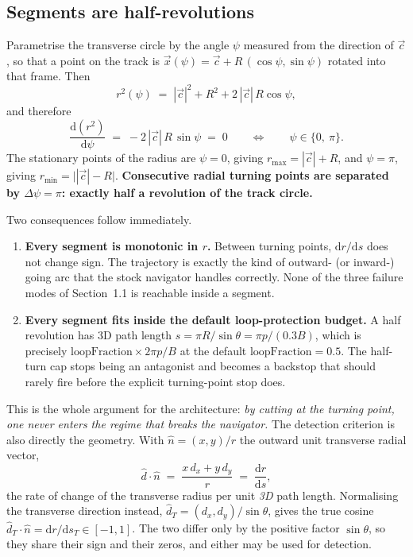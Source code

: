 \documentclass[11pt,a4paper]{article}
\begin{document}
\subsection{Segments are half-revolutions}

Parametrise the transverse circle by the angle $\psi$ measured from the
direction of $\vec{c}$, so that a point on the track is
$\vec{x}(\psi) = \vec{c} + R\,(\cos\psi, \sin\psi)$ rotated into that frame.
Then
\begin{equation}
  r^2(\psi) \;=\; |\vec{c}|^2 + R^2 + 2\,|\vec{c}|\,R\cos\psi ,
  \label{eq:rpsi}
\end{equation}
and therefore
\begin{equation}
  \frac{\mathrm{d}(r^2)}{\mathrm{d}\psi} \;=\; -2\,|\vec{c}|\,R\,\sin\psi
  \;=\; 0
  \qquad\Longleftrightarrow\qquad
  \psi \in \{0,\ \pi\} .
\end{equation}
The stationary points of the radius are $\psi = 0$, giving
$r_{\max} = |\vec{c}| + R$, and $\psi = \pi$, giving
$r_{\min} = \bigl||\vec{c}| - R\bigr|$. \textbf{Consecutive radial turning
points are separated by $\Delta\psi = \pi$: exactly half a revolution of the
track circle.}

Two consequences follow immediately.

\begin{enumerate}
\item \textbf{Every segment is monotonic in $r$.} Between turning points,
  $\mathrm{d}r/\mathrm{d}s$ does not change sign. The trajectory is exactly the
  kind of outward- (or inward-) going arc that the stock navigator handles
  correctly. None of the three failure modes of Section~1.1 is reachable inside
  a segment.
\item \textbf{Every segment fits inside the default loop-protection budget.}
  A half revolution has 3D path length $s = \pi R / \sin\theta = \pi p / (0.3 B)$,
  which is precisely $\text{loopFraction} \times 2\pi p / B$ at the default
  $\text{loopFraction} = 0.5$. The half-turn cap stops being an antagonist and
  becomes a backstop that should rarely fire before the explicit turning-point
  stop does.
\end{enumerate}

\noindent
This is the whole argument for the architecture: \emph{by cutting at the turning
point, one never enters the regime that breaks the navigator.} The detection
criterion is also directly the geometry. With $\hat{n} = (x,y)/r$ the outward
unit transverse radial vector,
\begin{equation}
  \hat{d}\cdot\hat{n}
  \;=\; \frac{x\,d_x + y\,d_y}{r}
  \;=\; \frac{\mathrm{d}r}{\mathrm{d}s} ,
  \label{eq:radcos}
\end{equation}
the rate of change of the transverse radius per unit \emph{3D} path length.
Normalising the transverse direction instead, $\hat{d}_T = (d_x,d_y)/\sin\theta$,
gives the true cosine $\hat{d}_T\cdot\hat{n} = \mathrm{d}r/\mathrm{d}s_T \in
[-1,1]$. The two differ only by the positive factor $\sin\theta$, so they share
their sign and their zeros, and either may be used for detection.
\end{document}

